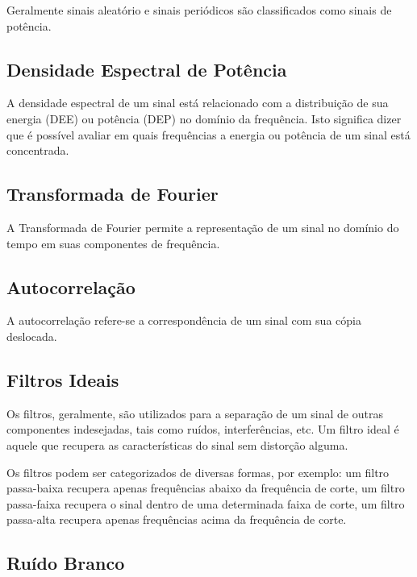 \documentclass[11pt]{classes/ifscarticle}
\begin{document}
Geralmente sinais aleatório e sinais periódicos são classificados como sinais de potência.



\subsection{Densidade Espectral de Potência}
\label{sec:DEP}

A densidade espectral de um sinal está relacionado com a distribuição de sua energia (DEE) ou potência (DEP) no domínio da frequência. Isto significa dizer que é possível avaliar em quais frequências a energia ou potência de um sinal está concentrada.  


\subsection{Transformada de Fourier}
\label{sec:transformada}

A Transformada de Fourier permite a representação de um sinal no domínio do tempo em suas componentes de frequência.

\subsection{Autocorrelação}
\label{sec:autocorrelacao}

A autocorrelação refere-se a correspondência de um sinal com sua cópia deslocada.

\subsection{Filtros Ideais}
\label{sec:filtros}

Os filtros, geralmente, são utilizados para a separação de um sinal de outras componentes indesejadas, tais como ruídos, interferências, etc.
Um filtro ideal é aquele que recupera as características do sinal sem distorção alguma. 

Os filtros podem ser categorizados de diversas formas, por exemplo:
um filtro passa-baixa recupera apenas frequências abaixo da frequência de corte, um filtro passa-faixa recupera o sinal dentro de uma determinada faixa de corte, um filtro passa-alta recupera apenas frequências acima da frequência de corte.

\subsection{Ruído Branco}
\label{sec:ruido}
\end{document}
